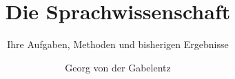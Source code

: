 \title{Die Sprachwissenschaft}  %
\subtitle{Ihre Aufgaben, Methoden und bisherigen Ergebnisse}
\BackBody{}
\author{Georg von der Gabelentz}
\renewcommand{\lsISBNdigital}{000-0-000000-00-0}
\renewcommand{\lsISBNhardcover}{000-0-000000-00-0}
\renewcommand{\lsISBNsoftcover}{000-0-000000-00-0}
\renewcommand{\lsSeries}{classics} %
\renewcommand{\lsSeriesNumber}{4} %
  
 